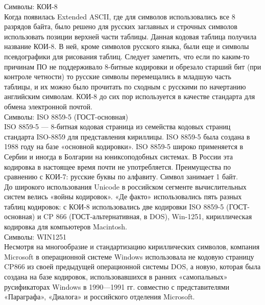 \noindent Символы: КОИ-8 \\
Когда появилась Extended ASCII, где для символов использовались все 8 разрядов байта, было решено для русских заглавных и строчных символов использовать позиции верхней части таблицы. Данная кодовая таблица получила название КОИ-8. В ней, кроме символов русского языка, были еще и символы псевдографики для рисования таблиц.
Следует заметить, что если по каким-то причинам ПО не поддерживало 8-битные кодировки и обрезало старший бит (при контроле четности) то русские символы перемещались в младшую часть таблицы, и их можно было прочитать по сходным с русскими по начертанию английским символам. КОИ-8 до сих пор используется в качестве стандарта для обмена электронной почтой. \\

\noindent Символы: ISO 8859-5 (ГОСТ-основная) \\
ISO 8859-5 — 8-битная кодовая страница из семейства кодовых страниц стандарта ISO-8859 для представления кириллицы. ISO 8859-5 была создана в 1988 году на базе «основной кодировки». ISO 8859-5 широко применяется в Сербии и иногда в Болгарии на юниксоподобных системах. В России эта кодировка в настоящее время почти не употребляется. Преимущества по сравнению с КОИ-7: русские буквы по алфавиту. Символ занимает 1 байт. \\
До широкого использования Unicode в российском сегменте вычислительных систем велись «войны кодировок». «Де факто» использовались пять разных таблиц кодировок: с КОИ-8 использовались две кодировки ISO 8859-5 (ГОСТ-основная) и CP 866 (ГОСТ-альтернативная, в DOS), Win-1251, кириллическая кодировка для компьютеров Macintosh.  \\

\noindent Символы: WIN1251 \\
Несмотря на многообразие и стандартизацию кириллических символов, компания Microsoft в операционной системе Windows использовала не кодовую страницу CP866 из своей предыдущей операционной системы DOS, а новую, которая была создана на базе кодировок, использовавшихся в ранних «самопальных» русификаторах Windows в 1990—1991 гг. совместно с представителями «Параграфа», «Диалога» и российского отделения Microsoft. \\

